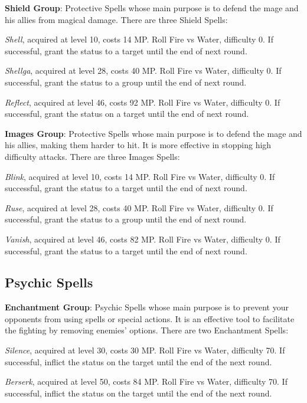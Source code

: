 \begin{multicols}{2}
    \textbf{Shield Group}: Protective Spells whose main purpose is to defend the mage and his allies from magical damage. There are three Shield Spells:

    \textit{Shell}, acquired at level 10, costs 14 MP. Roll Fire vs Water, difficulty 0. If successful, grant the  status to a target until the end of next round.

    \textit{Shellga}, acquired at level 28, costs 40 MP. Roll Fire vs Water, difficulty 0. If successful, grant the  status to a group until the end of next round.

    \textit{Reflect}, acquired at level 46, costs 92 MP. Roll Fire vs Water, difficulty 0. If successful, grant the  status on a target until the end of next round.

    \textbf{Images Group}: Protective Spells whose main purpose is to defend the mage and his allies, making them harder to hit. It is more effective in stopping high difficulty attacks. There are three Images Spells:

    \textit{Blink}, acquired at level 10, costs 14 MP. Roll Fire vs Water, difficulty 0. If successful, grant the  status to a target until the end of next round.

    \textit{Ruse}, acquired at level 28, costs 40 MP. Roll Fire vs Water, difficulty 0. If successful, grant the  status to a group until the end of next round.

    \textit{Vanish}, acquired at level 46, costs 82 MP. Roll Fire vs Water, difficulty 0. If successful, grant the  status to a target until the end of next round.

    \subsection{Psychic Spells}

    \textbf{Enchantment Group}: Psychic Spells whose main purpose is to prevent your opponents from using spells or special actions. It is an effective tool to facilitate the fighting by removing enemies’ options. There are two Enchantment Spells:

    \textit{Silence}, acquired at level 30, costs 30 MP. Roll Fire vs Water, difficulty 70. If successful, inflict the  status on the target until the end of the next round.

    \textit{Berserk}, acquired at level 50, costs 84 MP. Roll Fire vs Water, difficulty 70. If successful, inflict the  status on the target until the end of the next round.


\end{multicols}
